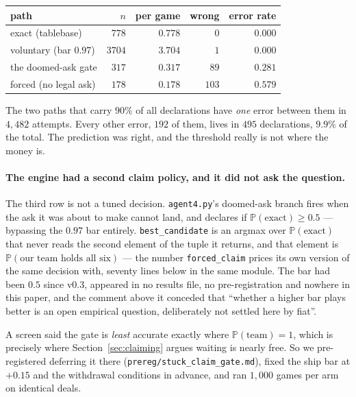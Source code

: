 \documentclass[11pt,letterpaper]{article}
\newcommand{\Prob}{\ensuremath{\mathbb{P}}}
\begin{document}
\begin{center}
\small
\begin{tabular}{lrrrr}
\toprule
path & $n$ & per game & wrong & error rate \\
\midrule
exact (tablebase) & $778$ & $0.778$ & $0$ & $0.000$ \\
voluntary (bar $0.97$) & $3704$ & $3.704$ & $1$ & $0.000$ \\
the doomed-ask gate & $317$ & $0.317$ & $89$ & $\mathbf{0.281}$ \\
forced (no legal ask) & $178$ & $0.178$ & $103$ & $\mathbf{0.579}$ \\
\bottomrule
\end{tabular}
\end{center}

\noindent The two paths that carry $90\%$ of all declarations have \emph{one}
error between them in $4{,}482$ attempts. Every other error, $192$ of them,
lives in $495$ declarations, $9.9\%$ of the total. The prediction was
right, and the threshold really is not where the money is.

\paragraph{The engine had a second claim policy, and it did not ask the
question.} The third row is not a tuned decision. \texttt{agent4.py}'s
doomed-ask branch fires when the ask it was about to make cannot land, and
declares if $\Prob(\text{exact}) \geq 0.5$ --- bypassing the $0.97$ bar
entirely. \texttt{best\_candidate} is an argmax over $\Prob(\text{exact})$ that
never reads the second element of the tuple it returns, and that element is
$\Prob(\text{our team holds all six})$ --- the number \texttt{forced\_claim}
prices its own version of the same decision with, seventy lines below in the
same module. The bar had been $0.5$ since v0.3, appeared in no results file, no
pre-registration and nowhere in this paper, and the comment above it conceded
that ``whether a higher bar plays better is an open empirical question,
deliberately not settled here by fiat''.

A screen said the gate is \emph{least} accurate exactly where
$\Prob(\text{team}) = 1$, which is precisely where
Section~\ref{sec:claiming} argues waiting is nearly free. So we
pre-registered deferring it there (\texttt{prereg/stuck\_claim\_gate.md}),
fixed the ship bar at $+0.15$ and the withdrawal conditions in advance, and
ran $1{,}000$ games per arm on identical deals.
\end{document}
